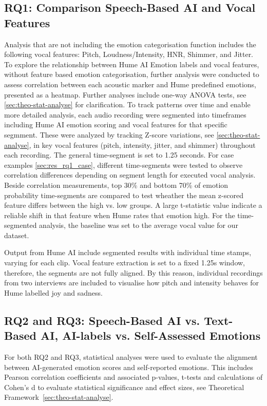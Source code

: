 \subsection{RQ1: Comparison Speech-Based AI and Vocal Features}
Analysis that are not including the emotion categorisation function includes the following vocal features: Pitch, Loudness/Intensity, HNR, Shimmer, and Jitter. To explore the relationship between Hume AI Emotion labels and vocal features, without feature based emotion categorisation, further analysis were conducted to assess correlation between each acoustic marker and Hume predefined emotions, presented as a heatmap.
Further analyses include one-way ANOVA tests, see \ref{sec:theo-stat-analyse} for clarification. 
To track patterns over time and enable more detailed analysis, each audio recording were segmented into timeframes including Hume AI emotion scoring and vocal features for that specific segmment. These were analyzed by tracking Z-score variations, see \ref{sec:theo-stat-analyse}, in key vocal features (pitch, intensity, jitter, and shimmer) throughout each recording.
The general time-segment is set to 1.25 seconds. For case examples \ref{sec:res_rq1_case}, different time-segments were tested to observe correlation differences depending on segment length for executed vocal analysis. 
Beside correlation measurements, top 30\% and bottom 70\% of emotion probability time-segments are compared to test wheather the mean z-scored feature differs between the high vs. low groups. 
A large t-statistic value indicate a reliable shift in that feature when Hume rates that emotion high. For the time-segmented analysis, the baseline was set to the average vocal value for our dataset. 

Output from Hume AI include segmented results with individual time stamps, varying for each clip. Vocal feature extraction is set to a fixed 1.25s window, therefore, the segments are not fully aligned. 
By this reason, individual recordings from two interviews are included to visualise how pitch and intensity behaves for Hume labelled joy and sadness. 

\subsection{RQ2 and RQ3: Speech-Based AI vs. Text-Based AI, AI-labels vs. Self-Assessed Emotions}
For both RQ2 and RQ3, statistical analyses were used to evaluate the alignment between AI-generated emotion scores and self-reported emotions. This includes Pearson correlation coefficients and associated p-values, t-tests and calculations of Cohen's d to evaluate statistical significance and effect sizes, see Theoretical Framework~\ref{sec:theo-stat-analyse}. 

